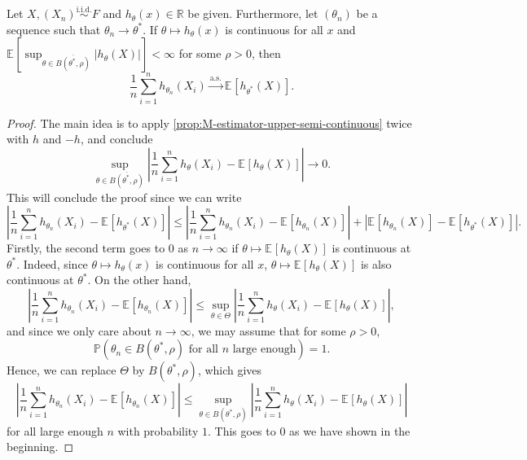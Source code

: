 \begin{theorem}\label{thm:uniform-SLLN}
	Let \(X, (X_n) \overset{\text{i.i.d.} }{\sim } F\) and \(h_\theta (x) \in \mathbb{R} \) be given. Furthermore, let \((\theta _n)\) be a sequence such that \(\theta _n \to \theta ^{\ast} \). If \(\theta \mapsto h_\theta (x)\) is continuous for all \(x\) and \(\mathbb{E}_{}[\sup _{\theta \in \overline{B(\theta ^{\ast} , \rho )} } \lvert h_\theta (X) \rvert ] < \infty \) for some \(\rho > 0\), then
	\[
		\frac{1}{n} \sum_{i=1}^{n} h_{\theta _n}(X_i)
		\overset{\text{a.s.} }{\to} \mathbb{E}_{}[h_{\theta ^{\ast}}(X)].
	\]
\end{theorem}
\begin{proof}
	The main idea is to apply \autoref{prop:M-estimator-upper-semi-continuous} twice with \(h\) and \(-h\), and conclude
	\[
		\sup _{\theta \in \overline{B(\theta ^{\ast} , \rho )} } \left\lvert \frac{1}{n}\sum_{i=1}^{n} h_{\theta }(X_i) - \mathbb{E}_{}[h_{\theta }(X)] \right\rvert
		\to 0.
	\]
	This will conclude the proof since we can write
	\[
		\left\lvert \frac{1}{n}\sum_{i=1}^{n} h_{\theta _n}(X_i) - \mathbb{E}_{}[h_{\theta ^{\ast} }(X)] \right\rvert
		\leq \left\lvert \frac{1}{n}\sum_{i=1}^{n} h_{\theta _n}(X_i) - \mathbb{E}_{}[h_{\theta _n}(X)] \right\rvert + \left\lvert \mathbb{E}_{}[h_{\theta _n}(X)] - \mathbb{E}_{}[h_{\theta ^{\ast} }(X)]  \right\rvert.
	\]
	Firstly, the second term goes to \(0\) as \(n \to \infty \) if \(\theta \mapsto \mathbb{E}_{}[h_\theta (X)] \) is continuous at \(\theta ^{\ast} \). Indeed, since \(\theta \mapsto h_\theta (x)\) is continuous for all \(x\), \(\theta \mapsto \mathbb{E}_{}[h_\theta (X)] \) is also continuous at \(\theta ^{\ast} \). On the other hand,
	\[
		\left\lvert \frac{1}{n}\sum_{i=1}^{n} h_{\theta _n}(X_i) - \mathbb{E}_{}[h_{\theta _n}(X)] \right\rvert
		\leq \sup _{\theta \in \Theta } \left\lvert \frac{1}{n}\sum_{i=1}^{n} h_{\theta }(X_i) - \mathbb{E}_{}[h_{\theta }(X)] \right\rvert,
	\]
	and since we only care about \(n\to \infty \), we may assume that for some \(\rho > 0\),
	\[
		\mathbb{P} (\theta _n \in B(\theta ^{\ast} , \rho ) \text{ for all \(n\) large enough} ) = 1.
	\]
	Hence, we can replace \(\Theta \) by \(B(\theta ^{\ast} , \rho )\), which gives
	\[
		\left\lvert \frac{1}{n}\sum_{i=1}^{n} h_{\theta _n}(X_i) - \mathbb{E}_{}[h_{\theta _n}(X)] \right\rvert
		\leq \sup _{\theta \in B(\theta ^{\ast} , \rho )} \left\lvert \frac{1}{n}\sum_{i=1}^{n} h_{\theta }(X_i) - \mathbb{E}_{}[h_{\theta }(X)] \right\rvert
	\]
	for all large enough \(n\) with probability \(1\). This goes to \(0\) as we have shown in the beginning.
\end{proof}

